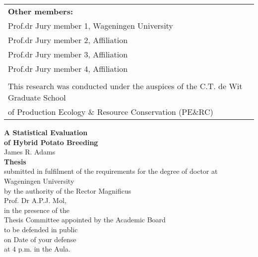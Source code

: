 \begin{tabular}{l}
    \textbf{Other members:}                                                                   \\  
    Prof.dr Jury member 1, Wageningen University                                              \\  
    Prof.dr Jury member 2, Affiliation                                                        \\  
    Prof.dr Jury member 3, Affiliation                                                        \\  
    Prof.dr Jury member 4, Affiliation                                                        \\  
                                                                                              \\  

    \small{This research was conducted under the auspices of the C.T. de Wit Graduate School} \\  
    \small{of Production Ecology \& Resource Conservation (PE$\&$RC)}                         \\  
\end{tabular}

\newpage
\thispagestyle{empty}
\begin{center}
\Huge{\textbf{A Statistical Evaluation}} \\
\Huge{\textbf{of Hybrid Potato Breeding}} \\
\vspace*{1cm}
\Large{James R. Adams}\\
\normalsize
\vspace*{\fill}
\textbf{Thesis} \\
submitted in fulfilment of the requirements for the degree of doctor at \\
Wageningen University\\
by the authority of the Rector Magnificus\\
Prof. Dr A.P.J. Mol,\\
in the presence of the\\
Thesis Committee appointed by the Academic Board\\
to be defended in public\\
on Date of your defense\\
at 4 p.m. in the Aula.\\
\end{center}

